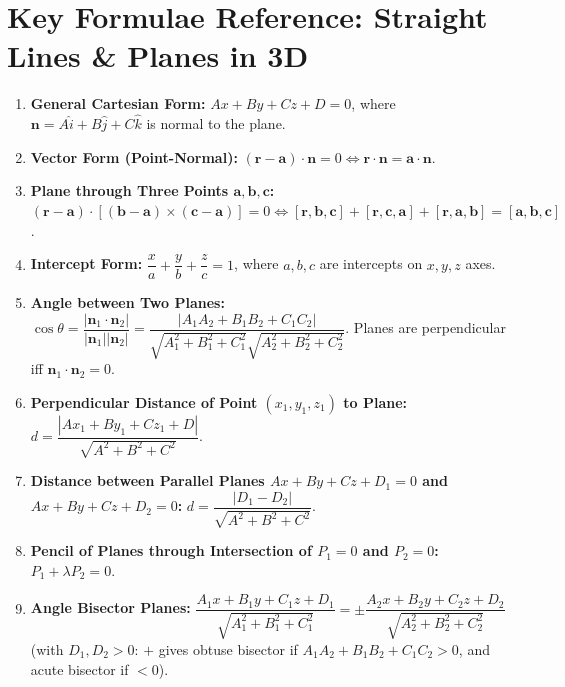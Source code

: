 \documentclass[11pt,a4paper]{article}
\begin{document}
\section*{Key Formulae Reference: Straight Lines \& Planes in 3D}
\begin{resultbox}
\begin{enumerate}
    \item \textbf{General Cartesian Form:} $Ax + By + Cz + D = 0$, where $\mathbf{n} = A\hat{i} + B\hat{j} + C\hat{k}$ is normal to the plane.
    \item \textbf{Vector Form (Point-Normal):} $(\mathbf{r} - \mathbf{a})\cdot\mathbf{n} = 0 \iff \mathbf{r}\cdot\mathbf{n} = \mathbf{a}\cdot\mathbf{n}$.
    \item \textbf{Plane through Three Points $\mathbf{a}, \mathbf{b}, \mathbf{c}$:} 
    $(\mathbf{r} - \mathbf{a})\cdot [(\mathbf{b} - \mathbf{a}) \times (\mathbf{c} - \mathbf{a})] = 0 \iff [\mathbf{r}, \mathbf{b}, \mathbf{c}] + [\mathbf{r}, \mathbf{c}, \mathbf{a}] + [\mathbf{r}, \mathbf{a}, \mathbf{b}] = [\mathbf{a}, \mathbf{b}, \mathbf{c}]$.
    \item \textbf{Intercept Form:} $\dfrac{x}{a} + \dfrac{y}{b} + \dfrac{z}{c} = 1$, where $a, b, c$ are intercepts on $x, y, z$ axes.
    \item \textbf{Angle between Two Planes:} $\cos\theta = \dfrac{|\mathbf{n}_1 \cdot \mathbf{n}_2|}{|\mathbf{n}_1||\mathbf{n}_2|} = \dfrac{|A_1 A_2 + B_1 B_2 + C_1 C_2|}{\sqrt{A_1^2+B_1^2+C_1^2}\sqrt{A_2^2+B_2^2+C_2^2}}$. Planes are perpendicular iff $\mathbf{n}_1 \cdot \mathbf{n}_2 = 0$.
    \item \textbf{Perpendicular Distance of Point $(x_1, y_1, z_1)$ to Plane:} $d = \dfrac{|Ax_1 + By_1 + Cz_1 + D|}{\sqrt{A^2 + B^2 + C^2}}$.
    \item \textbf{Distance between Parallel Planes $Ax+By+Cz+D_1=0$ and $Ax+By+Cz+D_2=0$:} $d = \dfrac{|D_1 - D_2|}{\sqrt{A^2 + B^2 + C^2}}$.
    \item \textbf{Pencil of Planes through Intersection of $P_1 = 0$ and $P_2 = 0$:} $P_1 + \lambda P_2 = 0$.
    \item \textbf{Angle Bisector Planes:} $\dfrac{A_1 x + B_1 y + C_1 z + D_1}{\sqrt{A_1^2+B_1^2+C_1^2}} = \pm \dfrac{A_2 x + B_2 y + C_2 z + D_2}{\sqrt{A_2^2+B_2^2+C_2^2}}$ (with $D_1, D_2 > 0$: $+$ gives obtuse bisector if $A_1 A_2 + B_1 B_2 + C_1 C_2 > 0$, and acute bisector if $< 0$).
\end{enumerate}
\end{resultbox}
\end{document}
